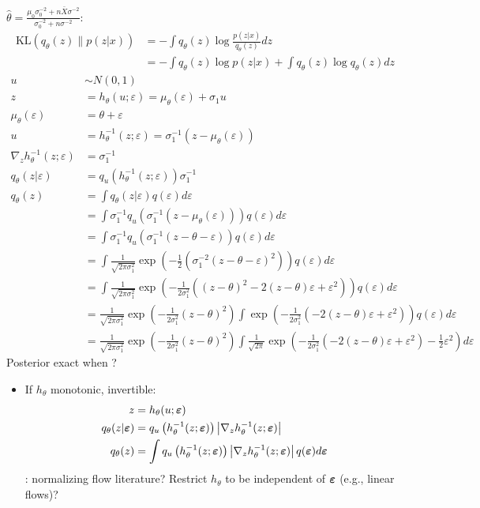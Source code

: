 \documentclass[10pt]{article}
\begin{document}
$\hat{\theta}=\frac{\mu_0\sigma_0^{-2}+n\bar{X}\sigma^{-2}}{\sigma_0^{-2}+n\sigma^{-2}}$:
\begin{align*}
\mathrm{KL}(q_\theta(z)\|p(z|x)) &= - \int q_\theta(z)\log\frac{p(z|x)}{q_\theta(z)}dz \\
&= - \int q_\theta(z)\log p(z|x) + \int q_\theta(z)\log q_\theta(z)dz 
\end{align*}
\begin{align*}
u &\sim N(0,1) \\
z &= h_\theta(u;\varepsilon) = \mu_\theta(\varepsilon) + \sigma_1u \\
\mu_\theta(\varepsilon) &= \theta + \varepsilon \\
u &= h_\theta^{-1}(z;\varepsilon) = \sigma_1^{-1}(z-\mu_\theta(\varepsilon)) \\
\nabla_z h_\theta^{-1}(z;\varepsilon) &= \sigma_1^{-1} \\
q_\theta(z|\varepsilon) &= q_u(h_\theta^{-1}(z;\varepsilon))\sigma_1^{-1} \\
q_\theta(z) &= \int q_\theta(z|\varepsilon)q(\varepsilon)d\varepsilon \\
&= \int \sigma_1^{-1}q_u\left(\sigma_1^{-1}\left(z-\mu_\theta(\varepsilon)\right)\right)q(\varepsilon)d\varepsilon \\
&= \int \sigma_1^{-1}q_u\left(\sigma_1^{-1}\left(z-\theta-\varepsilon\right)\right)q(\varepsilon)d\varepsilon \\
&= \int \frac{1}{\sqrt{2\pi\sigma_1^2}}\exp\left(-\frac{1}{2}\left(\sigma_1^{-2}(z-\theta-\varepsilon)^2\right)\right)q(\varepsilon)d\varepsilon \\
&= \int \frac{1}{\sqrt{2\pi\sigma_1^2}}\exp\left(-\frac{1}{2\sigma_1^2}\left((z-\theta)^2-2(z-\theta)\varepsilon+\varepsilon^2\right)\right)q(\varepsilon)d\varepsilon \\
&= \frac{1}{\sqrt{2\pi\sigma_1^2}}\exp\left(-\frac{1}{2\sigma_1^2}(z-\theta)^2\right) \int \exp\left(-\frac{1}{2\sigma_1^2}\left(-2(z-\theta)\varepsilon+\varepsilon^2\right)\right)q(\varepsilon)d\varepsilon \\
&= \frac{1}{\sqrt{2\pi\sigma_1^2}}\exp\left(-\frac{1}{2\sigma_1^2}(z-\theta)^2\right) \int \frac{1}{\sqrt{2\pi}}\exp\left(-\frac{1}{2\sigma_1^2}\left(-2(z-\theta)\varepsilon+\varepsilon^2\right)-\frac{1}{2}\varepsilon^2\right)d\varepsilon
\end{align*}
Posterior exact when ?

\begin{itemize}

\item
If $h_\theta$ monotonic, invertible:
\begin{align*}
z &= h_\theta(u;\bm{\varepsilon}) \\
q_\theta(z|\bm{\varepsilon}) &= q_u\left(h_\theta^{-1}(z;\bm{\varepsilon})\right)\left|\nabla_zh_\theta^{-1}(z;\bm{\varepsilon})\right| \\
q_\theta(z) &= \int q_u\left(h_\theta^{-1}(z;\bm{\varepsilon})\right)\left|\nabla_zh_\theta^{-1}(z;\bm{\varepsilon})\right| q(\bm{\varepsilon})d\bm{\varepsilon}
\end{align*}
\todo: normalizing flow literature? Restrict $h_\theta$ to be independent of $\bm{\varepsilon}$ (e.g., linear flows)?

\end{itemize}
\end{document}
